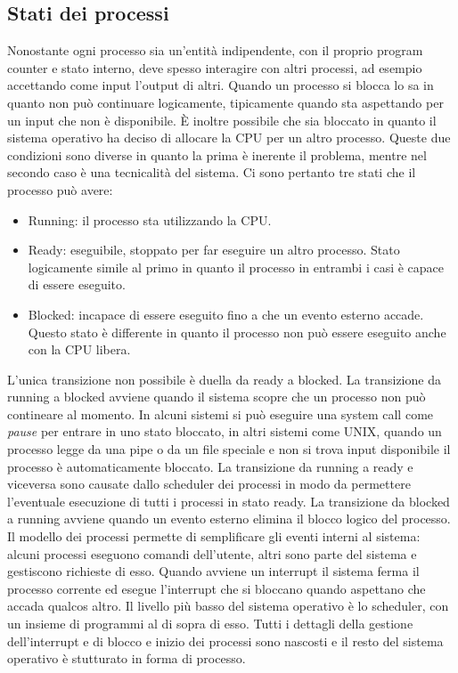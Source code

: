 \subsection{Stati dei processi}
Nonostante ogni processo sia un'entit\`a indipendente, con il proprio program counter e stato interno, deve spesso interagire con altri processi, ad esempio accettando come input
l'output di altri. Quando un processo si blocca lo sa in quanto non pu\`o continuare logicamente, tipicamente quando sta aspettando per un input che non \`e disponibile. \`E inoltre
possibile che sia bloccato in quanto il sistema operativo ha deciso di allocare la CPU per un altro processo. Queste due condizioni sono diverse in quanto la prima \`e inerente il
problema, mentre nel secondo caso \`e una tecnicalit\`a del sistema. Ci sono pertanto tre stati che il processo pu\`o avere:
\begin{itemize}
	\item Running: il processo sta utilizzando la CPU.
	\item Ready: eseguibile, stoppato per far eseguire un altro processo. Stato logicamente simile al primo in quanto il processo in entrambi i casi \`e capace di essere eseguito.
	\item Blocked: incapace di essere eseguito fino a che un evento esterno accade. Questo stato \`e differente in quanto il processo non pu\`o essere eseguito anche con la CPU
	      libera.
\end{itemize}
L'unica transizione non possibile \`e duella da ready a blocked. La transizione da running a blocked avviene quando il sistema scopre che un processo non pu\`o contineare al momento.
In alcuni sistemi si pu\`o eseguire una system call come \emph{pause} per entrare in uno stato bloccato, in altri sistemi come UNIX, quando un processo legge da una pipe o da un file
speciale e non si trova input disponibile il processo \`e automaticamente bloccato. La transizione da running a ready e viceversa sono causate dallo scheduler dei processi in modo da
permettere l'eventuale esecuzione di tutti i processi in stato ready. La transizione da blocked a running avviene quando un evento esterno elimina il blocco logico del processo.
Il modello dei processi permette di semplificare gli eventi interni al sistema: alcuni processi eseguono comandi dell'utente, altri sono parte del sistema e gestiscono richieste di
esso. Quando avviene un interrupt il sistema ferma il processo corrente ed esegue l'interrupt che si bloccano quando aspettano che accada qualcos altro. Il livello pi\`u basso del
sistema operativo \`e lo scheduler, con un insieme di programmi al di sopra di esso. Tutti i dettagli della gestione dell'interrupt e di blocco e inizio dei processi sono nascosti e il
resto del sistema operativo \`e stutturato in forma di processo.
